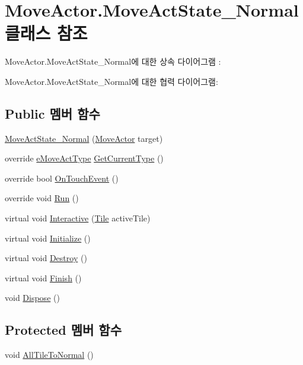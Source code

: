 \hypertarget{class_move_actor_1_1_move_act_state___normal}{}\section{Move\+Actor.\+Move\+Act\+State\+\_\+\+Normal 클래스 참조}
\label{class_move_actor_1_1_move_act_state___normal}


Move\+Actor.\+Move\+Act\+State\+\_\+\+Normal에 대한 상속 다이어그램 \+: 


Move\+Actor.\+Move\+Act\+State\+\_\+\+Normal에 대한 협력 다이어그램\+:
\subsection*{Public 멤버 함수}
\begin{DoxyCompactItemize}
\item 
\hyperlink{class_move_actor_1_1_move_act_state___normal_a43d9a631de0e6f95d31f7b1894c7cbd7}{Move\+Act\+State\+\_\+\+Normal} (\hyperlink{class_move_actor}{Move\+Actor} target)
\item 
override \hyperlink{_move_actor_8cs_a1df5a2532cc7e6bde40a57d2dcbe23fe}{e\+Move\+Act\+Type} \hyperlink{class_move_actor_1_1_move_act_state___normal_a468c609527da80cb60e43c4ae99feb6d}{Get\+Current\+Type} ()
\item 
override bool \hyperlink{class_move_actor_1_1_move_act_state___normal_a56d413f30e45ab6b2d3a22b972588e95}{On\+Touch\+Event} ()
\item 
override void \hyperlink{class_move_actor_1_1_move_act_state___normal_ac679d09107c9471774c30ffc169b5ad0}{Run} ()
\item 
virtual void \hyperlink{class_move_actor_1_1_move_act_state_ae43bc38159d36bd83eaf172d946c0415}{Interactive} (\hyperlink{class_tile}{Tile} active\+Tile)
\item 
virtual void \hyperlink{class_f_z_1_1_state_a27ac6fd2e844476017b35aa781d73c8c}{Initialize} ()
\item 
virtual void \hyperlink{class_f_z_1_1_state_aa85fdf4a5495d6d5d3ed4aeda3497c8a}{Destroy} ()
\item 
virtual void \hyperlink{class_f_z_1_1_state_a288bb8c3fceee4bf03f01e295dcef1be}{Finish} ()
\item 
void \hyperlink{class_f_z_1_1_state_a598887d3fbb412fada132dc1c079b25b}{Dispose} ()
\end{DoxyCompactItemize}
\subsection*{Protected 멤버 함수}
\begin{DoxyCompactItemize}
\item 
void \hyperlink{class_move_actor_1_1_move_act_state_a8e1d5e7942d4f9de8c8e0732964c554b}{All\+Tile\+To\+Normal} ()
\end{DoxyCompactItemize}
